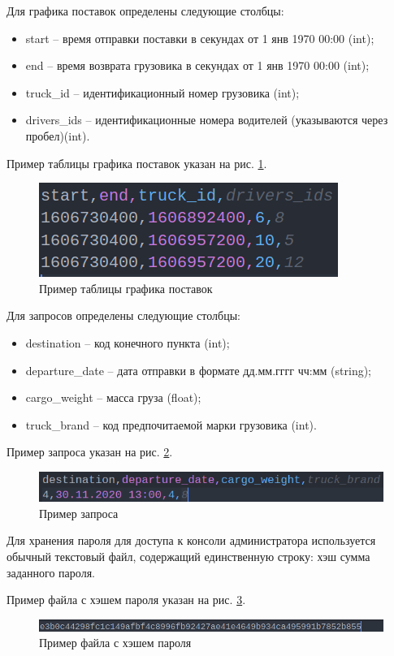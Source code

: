 Для графика поставок определены следующие столбцы:
\begin{itemize}
	\item start -- время отправки поставки в секундах от 1 янв 1970 00:00 (int);
	\item end -- время возврата грузовика в секундах от 1 янв 1970 00:00 (int);
	\item truck\_id -- идентификационный номер грузовика (int);
	\item drivers\_ids -- идентификационные номера водителей (указываются через пробел)(int).
\end{itemize}

Пример таблицы графика поставок указан на рис. \ref{schedule_table}.

\begin{figure}[hpt!]
	\centering
	\includegraphics[width=0.8\linewidth]{photo/schedule_table}
	\caption{Пример таблицы графика поставок}
	\label{schedule_table}
\end{figure}

\newpage

Для запросов определены следующие столбцы:
\begin{itemize}
	\item destination -- код конечного пункта (int);
	\item departure\_date -- дата отправки в формате дд.мм.гггг чч:мм (string);
	\item cargo\_weight -- масса груза (float);
	\item truck\_brand -- код предпочитаемой марки грузовика (int).
\end{itemize}

Пример запроса указан на рис. \ref{request_table}.

\begin{figure}[hpt!]
	\centering
	\includegraphics[width=0.8\linewidth]{photo/request_table}
	\caption{Пример запроса}
	\label{request_table}
\end{figure}

Для хранения пароля для доступа к консоли администратора используется обычный текстовый файл, содержащий единственную строку: хэш сумма заданного пароля.

Пример файла с хэшем пароля указан на рис. \ref{hash_example}.

\begin{figure}[hpt!]
	\centering
	\includegraphics[width=0.8\linewidth]{photo/hash_example}
	\caption{Пример файла с хэшем пароля}
	\label{hash_example}
\end{figure}